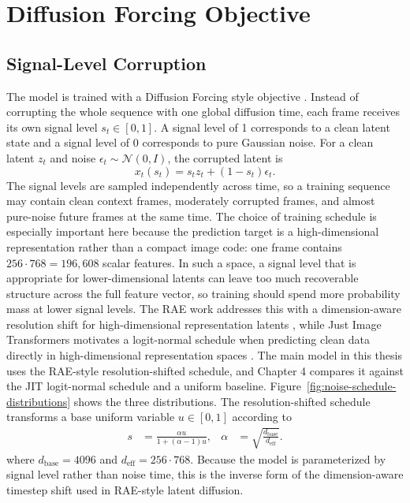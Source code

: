 \documentclass[12pt]{report}
\begin{document}
\section{Diffusion Forcing Objective}
\subsection{Signal-Level Corruption}
The model is trained with a Diffusion Forcing style objective \cite{chen2024diffusionforcing}. Instead of corrupting the whole sequence with one global diffusion time, each frame receives its own signal level $s_t \in [0,1]$. A signal level of 1 corresponds to a clean latent state and a signal level of 0 corresponds to pure Gaussian noise. For a clean latent $z_t$ and noise $\epsilon_t \sim \mathcal{N}(0,I)$, the corrupted latent is
\begin{equation}
\label{eq:signal-corruption}
x_t(s_t) = s_t z_t + (1-s_t)\epsilon_t .
\end{equation}
The signal levels are sampled independently across time, so a training sequence may contain clean context frames, moderately corrupted frames, and almost pure-noise future frames at the same time. The choice of training schedule is especially important here because the prediction target is a high-dimensional representation rather than a compact image code: one frame contains $256 \cdot 768 = 196{,}608$ scalar features. In such a space, a signal level that is appropriate for lower-dimensional latents can leave too much recoverable structure across the full feature vector, so training should spend more probability mass at lower signal levels. The RAE work addresses this with a dimension-aware resolution shift for high-dimensional representation latents \cite{dt_rae2025}, while Just Image Transformers motivates a logit-normal schedule when predicting clean data directly in high-dimensional representation spaces \cite{li2025jit}. The main model in this thesis uses the RAE-style resolution-shifted schedule, and Chapter 4 compares it against the JIT logit-normal schedule and a uniform baseline. Figure~\ref{fig:noise-schedule-distributions} shows the three distributions. The resolution-shifted schedule transforms a base uniform variable $u \in [0,1]$ according to
\begin{equation}
\label{eq:resolution-shifted-signal}
\begin{aligned}
s &= \frac{\alpha u}{1 + (\alpha - 1)u},
&
\alpha &= \sqrt{\frac{d_{\mathrm{base}}}{d_{\mathrm{eff}}}}.
\end{aligned}
\end{equation}
where $d_{\mathrm{base}}=4096$ and $d_{\mathrm{eff}}=256\cdot768$. Because the model is parameterized by signal level rather than noise time, this is the inverse form of the dimension-aware timestep shift used in RAE-style latent diffusion.
\end{document}

